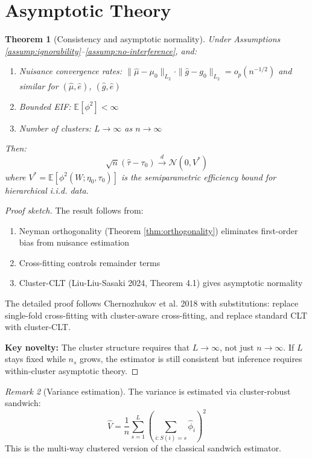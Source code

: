 \documentclass[11pt]{article}
\theoremstyle{plain}
\newtheorem{theorem}{Theorem}
\theoremstyle{definition}
\theoremstyle{remark}
\newtheorem{remark}[theorem]{Remark}
\newcommand{\E}{\mathbb{E}}
\begin{document}
\section{Asymptotic Theory}
\label{sec:asymptotics}

\begin{theorem}[Consistency and asymptotic normality]
\label{thm:asymptotic}
Under Assumptions \ref{assump:ignorability}--\ref{assump:no-interference}, and:
\begin{enumerate}[itemsep=2pt]
    \item Nuisance convergence rates: $\|\hat\mu - \mu_0\|_{L_2} \cdot \|\hat g - g_0\|_{L_2} = o_p(n^{-1/2})$ and similar for $(\hat\mu, \hat e)$, $(\hat g, \hat e)$
    \item Bounded EIF: $\E[\phi^2] < \infty$
    \item Number of clusters: $L \to \infty$ as $n \to \infty$
\end{enumerate}
Then:
\begin{equation}
    \sqrt{n}(\hat\tau - \tau_0) \xrightarrow{d} \mathcal{N}(0, V^*)
\end{equation}
where $V^* = \E[\phi^2(W; \eta_0, \tau_0)]$ is the semiparametric efficiency bound for hierarchical i.i.d. data.
\end{theorem}

\begin{proof}[Proof sketch]
The result follows from:
\begin{enumerate}
    \item Neyman orthogonality (Theorem \ref{thm:orthogonality}) eliminates first-order bias from nuisance estimation
    \item Cross-fitting controls remainder terms
    \item Cluster-CLT (Liu-Liu-Sasaki 2024, Theorem 4.1) gives asymptotic normality
\end{enumerate}

The detailed proof follows Chernozhukov et al. 2018 with substitutions: replace single-fold cross-fitting with cluster-aware cross-fitting, and replace standard CLT with cluster-CLT.

\textbf{Key novelty:} The cluster structure requires that $L \to \infty$, not just $n \to \infty$. If $L$ stays fixed while $n_s$ grows, the estimator is still consistent but inference requires within-cluster asymptotic theory.
\end{proof}

\begin{remark}[Variance estimation]
The variance is estimated via cluster-robust sandwich:
\begin{equation}
    \hat V = \frac{1}{n} \sum_{s=1}^L \left( \sum_{i: S(i) = s} \hat\phi_i \right)^2
\end{equation}
This is the multi-way clustered version of the classical sandwich estimator.
\end{remark}
\end{document}
